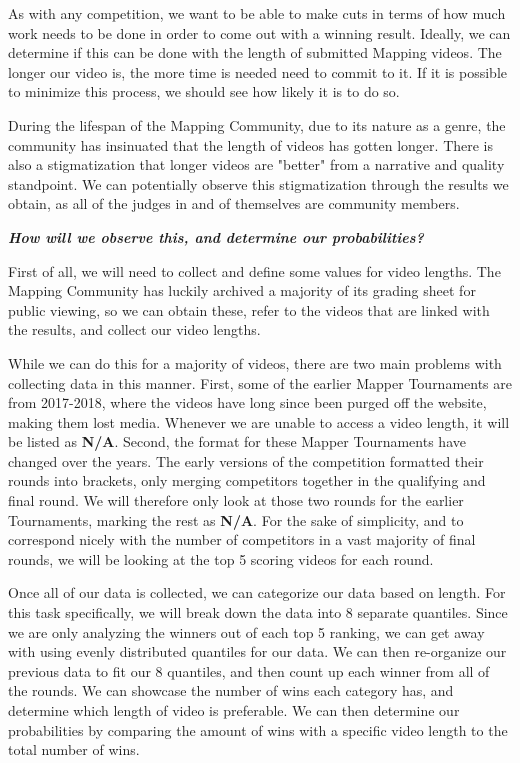 \documentclass[letterpaper,twocolumn,amsmath,amssymb,prl,nolongbibliography,url,reprint]{revtex4-2}
\begin{document}
As with any competition, we want to be able to make cuts in terms of how much work needs to be done in order to come out with a winning result. Ideally, we can determine if this can be done with the length of submitted Mapping videos. The longer our video is, the more time is needed need to commit to it. If it is possible to minimize this process, we should see how likely it is to do so.

During the lifespan of the Mapping Community, due to its nature as a genre, the community has insinuated that the length of videos has gotten longer. There is also a stigmatization that longer videos are "better" from a narrative and quality standpoint. We can potentially observe this stigmatization through the results we obtain, as all of the judges in and of themselves are community members. 

\textbf{\emph{How will we observe this, and determine our probabilities?}}

First of all, we will need to collect and define some values for video lengths. The Mapping Community has luckily archived a majority of its grading sheet for public viewing, so we can obtain these, refer to the videos that are linked with the results, and collect our video lengths. 

While we can do this for a majority of videos, there are two main problems with collecting data in this manner. First, some of the earlier Mapper Tournaments are from 2017-2018, where the videos have long since been purged off the website, making them lost media. Whenever we are unable to access a video length, it will be listed as \textbf{N/A}. Second, the format for these Mapper Tournaments have changed over the years. The early versions of the competition formatted their rounds into brackets, only merging competitors together in the qualifying and final round. We will therefore only look at those two rounds for the earlier Tournaments, marking the rest as \textbf{N/A}. For the sake of simplicity, and to correspond nicely with the number of competitors in a vast majority of final rounds, we will be looking at the top 5 scoring videos for each round.

Once all of our data is collected, we can categorize our data based on length. For this task specifically, we will break down the data into 8 separate quantiles. Since we are only analyzing the winners out of each top 5 ranking, we can get away with using evenly distributed quantiles for our data. We can then re-organize our previous data to fit our 8 quantiles, and then count up each winner from all of the rounds. We can showcase the number of wins each category has, and determine which length of video is preferable. We can then determine our probabilities by comparing the amount of wins with a specific video length to the total number of wins. 
\end{document}
